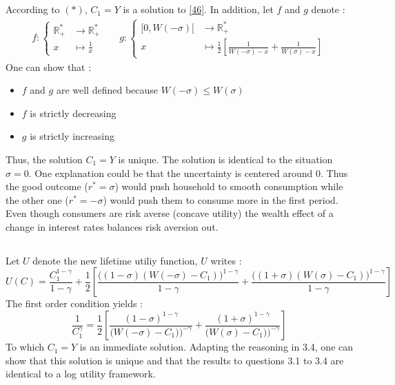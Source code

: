 \documentclass{article}
\begin{document}
\subsection{}
According to $(*)$, $C_1 = Y$ is a solution to \eqref{46}. \newline
In addition, let $f$ and $g$ denote :
\begin{align}
    f :
    \begin{cases}
        \mathbb{R_+^*} &\to \mathbb{R_+^*} \\
        x &\mapsto \frac{1}{x}
    \end{cases} &&
    g :
    \begin{cases}
        [0, W(-\sigma)[ &\to \mathbb{R_+^*} \\
        x &\mapsto \frac{1}{2}\left[ \frac{1}{W(-\sigma)-x} + \frac{1}{W(\sigma)- x}  \right]
    \end{cases}
\end{align}
One can show that :
\begin{itemize}
    \item $f$ and $g$ are well defined because $W(-\sigma) \leq W(\sigma)$
    \item $f$ is strictly decreasing
    \item $g$ is strictly increasing
\end{itemize}
Thus, the solution $C_1 = Y$ is unique.\newline
The solution is identical to the situation $\sigma = 0$. One explanation could be that the uncertainty is centered around 0. Thus the good outcome ($r^*=\sigma$) would push household to smooth consumption while the other one ($r^*=-\sigma$) would push them to consume more in the first period. Even though consumers are risk averse (concave utility) the wealth effect of a change in interest rates balances risk aversion out.
\subsection{}
Let $U$ denote the new lifetime utiliy function, $U$ writes :
\begin{equation}
    U(C) = \frac{C_1^{1-\gamma}}{1-\gamma} + \frac{1}{2}\left[  \frac{\Big((1-\sigma)(W(-\sigma)-C_1)\Big)^{1-\gamma}}{1-\gamma} + \frac{\Big((1+\sigma)(W(\sigma)-C_1)\Big)^{1-\gamma}}{1-\gamma}\right] 
\end{equation}
The first order condition yields :
\begin{equation}
    \frac{1}{C_1^{\gamma}} = \frac{1}{2} \left[ \frac{(1-\sigma)^{1-\gamma}}{\Big(W(-\sigma) - C_1)\Big)^{-\gamma}} + \frac{(1+\sigma)^{1-\gamma}}{\Big(W(\sigma) - C_1)\Big)^{-\gamma}}  \right]
\end{equation}
To which $C_1 = Y$ is an immediate solution.
Adapting the reasoning in 3.4, one can show that this solution is unique and that the results to questions 3.1 to 3.4 are identical to a log utility framework.
\end{document}
